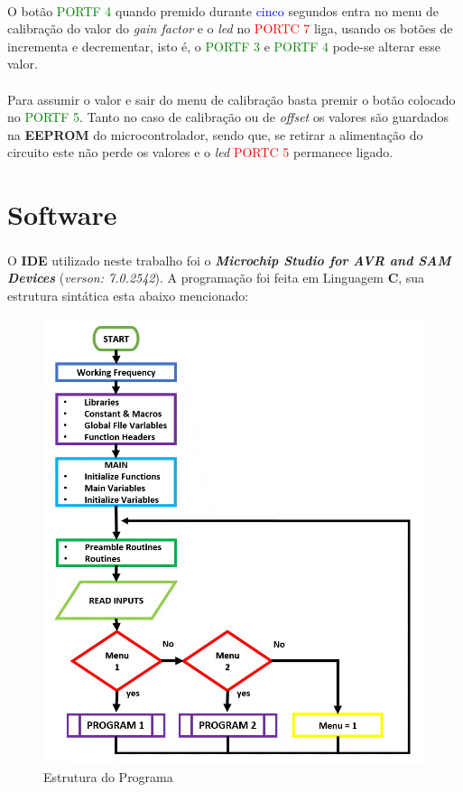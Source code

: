 \\
O botão \textcolor{green}{PORTF 4} quando premido durante \textcolor{blue}{cinco} segundos entra no menu de calibração do valor do \textit{gain factor} e o \textit{led} no \textcolor{red}{PORTC 7} liga, usando os botões de incrementa e decrementar, isto é, o
\textcolor{green}{PORTF 3} e \textcolor{green}{PORTF 4} pode-se alterar esse valor.\\
\\
Para assumir o valor e sair do menu de calibração basta premir o botão colocado no \textcolor{green}{PORTF 5}. Tanto no caso de calibração ou de \textit{offset} os valores são guardados na \textbf{EEPROM} do microcontrolador, sendo que, se retirar a alimentação do circuito este não perde os valores e o \textit{led} \textcolor{red}{PORTC 5} permanece ligado.
\newpage
\section{Software}
O \textbf{IDE} utilizado neste trabalho foi o \textbf{\textit{{Microchip Studio for AVR\textsuperscript{\textregistered} and SAM Devices}}} (\textit{verson: 7.0.2542}). A programação foi feita em Linguagem \textbf{C}, sua estrutura sintática esta abaixo mencionado:
\begin{figure}[H]
	\centering
	\includegraphics[scale=0.7]{./image/PESTA/flowchart/Main_Program_1.jpg}
	\caption{Estrutura do Programa}
	\label{Main_Program_1}
\end{figure}

